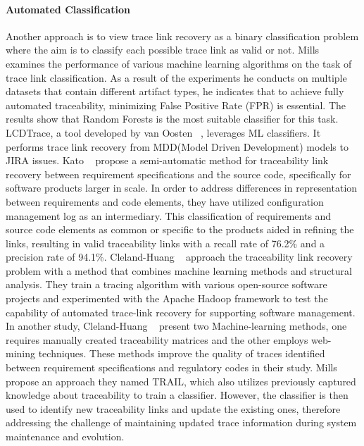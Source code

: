 \paragraph{Automated Classification} Another approach is to view trace link recovery as a binary classification problem where the aim is to classify each possible trace link as valid or not. Mills~\cite{mills-2017} examines the performance of various machine learning algorithms on the task of trace link classification. As a result of the experiments he conducts on multiple datasets that contain different artifact types, he indicates that to achieve fully automated traceability, minimizing False Positive Rate (FPR) is essential. The results show that Random Forests is the most suitable classifier for this task.
LCDTrace, a tool developed by van Oosten \etal{}~\cite{VANOOSTEN2023107226}, leverages ML classifiers. It performs trace link recovery from MDD(Model Driven Development) models to JIRA issues.
Kato \etal{}~\cite{kato-2013} propose a semi-automatic method for traceability link recovery between requirement specifications and the source code, specifically for software products larger in scale. In order to address differences in representation between requirements and code elements, they have utilized configuration management log as an intermediary. This classification of requirements and source code elements as common or specific to the products aided in refining the links, resulting in valid traceability links with a recall rate of 76.2\% and a precision rate of 94.1\%.
Cleland-Huang \etal{}~\cite{jane-2012} approach the traceability link recovery problem with a method that combines machine learning methods and structural analysis. They train a tracing algorithm with various open-source software projects and experimented with the Apache Hadoop framework to test the capability of automated trace-link recovery for supporting software management.
In another study, Cleland-Huang \etal{}~\cite{cleland-2010} present two Machine-learning methods, one requires manually created traceability matrices and the other employs web-mining techniques. These methods improve the quality of traces identified between requirement specifications and regulatory codes in their study.
Mills \etal{}~\cite{mills-2018} propose an approach they named TRAIL, which also utilizes previously captured knowledge about traceability to train a classifier. However, the classifier is then used to identify new traceability links and update the existing ones, therefore addressing the challenge of maintaining updated trace information during system maintenance and evolution.

